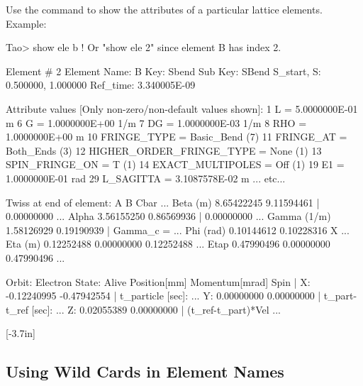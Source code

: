 \documentclass{hitec}     %
\begin{document}
Use the  command to show the attributes of a particular lattice elements. Example:
\begin{code} 
Tao> show ele b   ! Or "show ele 2" since element B has index 2.

 Element #                2
 Element Name: B
 Key: Sbend
 Sub Key: SBend
 S_start, S:    0.500000,    1.000000
 Ref_time:  3.340005E-09

 Attribute values [Only non-zero/non-default values shown]:
    1   L                            =  5.0000000E-01 m
    6   G                            =  1.0000000E+00 1/m
    7   DG                           =  1.0000000E-03 1/m
    8   RHO                          =  1.0000000E+00 m
   10   FRINGE_TYPE                  =  Basic_Bend (7)
   11   FRINGE_AT                    =  Both_Ends (3)
   12   HIGHER_ORDER_FRINGE_TYPE     =  None (1)
   13   SPIN_FRINGE_ON               =  T (1)
   14   EXACT_MULTIPOLES             =  Off (1)
   19   E1                           =  1.0000000E-01 rad
   29   L_SAGITTA                    =  3.1087578E-02 m
     ... etc...

Twiss at end of element:
                          A              B            Cbar    ...
  Beta (m)         8.65422245     9.11594461  |   0.00000000  ...
  Alpha            3.56155250     0.86569936  |   0.00000000  ... 
  Gamma (1/m)      1.58126929     0.19190939  |   Gamma_c =   ...
  Phi (rad)        0.10144612     0.10228316            X     ...
  Eta (m)          0.12252488     0.00000000     0.12252488   ...
  Etap             0.47990496     0.00000000     0.47990496   ...

Orbit:  Electron   State: Alive
         Position[mm] Momentum[mrad]        Spin   |
  X:      -0.12240995    -0.47942554               | t_particle [sec]:   ...
  Y:       0.00000000     0.00000000               | t_part-t_ref [sec]: ...
  Z:       0.02055389     0.00000000               | (t_ref-t_part)*Vel  ...
\end{code}
%
[-3.7in]

\newpage

\subsection{Using Wild Cards in Element Names}
\label{s:wild}
\end{document}

